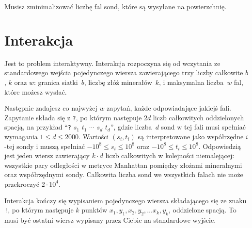 Musisz zminimalizować liczbę fal sond, które są wysyłane na powierzchnię.


\section*{Interakcja}

Jest to problem interaktywny.
Interakcja rozpoczyna się od wczytania ze standardowego wejścia pojedynczego wiersza zawierającego trzy liczby całkowite $b$, $k$ oraz $w$:
granica siatki~$b$,
liczbę złóż minerałów~$k$,
i maksymalna liczba~$w$ fal, które możesz wysłać.

Następnie zadajesz co najwyżej $w$ zapytań, każde odpowiadające jakiejś fali.
Zapytanie składa się z \texttt{?}, po którym następuje $2d$ liczb całkowitych oddzielonych spacją, na przykład ``\texttt{?} $s_1$ $t_1$ $\cdots$ $s_d$ $t_d$'', gdzie liczba~$d$ sond w tej fali musi spełniać wymagania
$1\leq d\leq 2000$. %
Wartości $(s_i,t_i)$ są interpretowane jako współrzędne $i$-tej sondy i muszą spełniać
$-10^8 \leq s_i \leq 10^8$ oraz $-10^8 \leq t_i \leq 10^8$. %
Odpowiedzią jest jeden wiersz zawierający $k \cdot d$ liczb całkowitych w kolejności niemalejącej: wszystkie pary odległości w metryce Manhattan pomiędzy złożami mineralnymi oraz współrzędnymi sondy.
Całkowita liczba sond we wszystkich falach nie może przekroczyć
$2\cdot 10^4.$ %

Interakcja kończy się wypisaniem pojedynczego wiersza składającego się ze znaku \texttt{!}, po którym następuje $k$ punktów $x_1, y_1, x_2, y_2, \ldots x_k, y_k$, oddzielone spacją.
To musi być ostatni wiersz wypisany przez Ciebie na standardowe wyjście.


